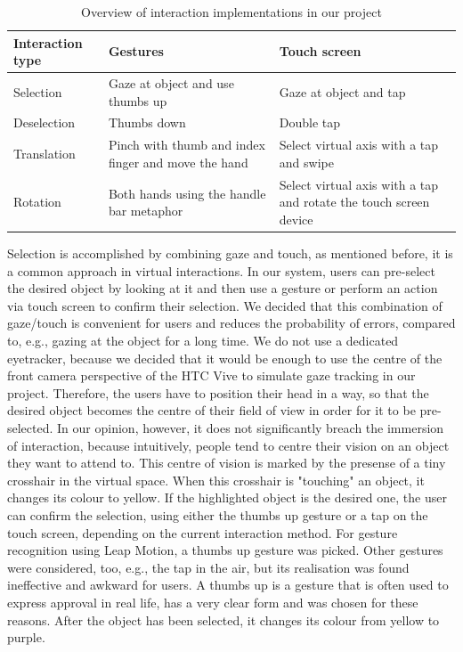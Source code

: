 \begin{table}
\centering
\begin{tabular}{|l|p{5cm}|p{5cm}|}
\hline
\textbf{Interaction type} & \textbf{Gestures} & \textbf{Touch screen} \\
\hline
Selection & Gaze at object and use thumbs up & Gaze at object and tap \\
\hline
Deselection & Thumbs down & Double tap \\
\hline
Translation & Pinch with thumb and index finger and move the hand & Select virtual axis with a tap and swipe \\
\hline
Rotation & Both hands using the handle bar metaphor & Select virtual axis with a tap and rotate the touch screen device \\
\hline
\end{tabular}
\caption{Overview of interaction implementations in our project}
\label{interactions}
\end{table}

Selection is accomplished by combining gaze and touch, as mentioned before, it is a common approach in virtual interactions. In our system, users can pre-select the desired object by looking at it and then use a gesture or perform an action via touch screen to confirm their selection. We decided that this combination of gaze/touch is convenient for users and reduces the probability of errors, compared to, e.g., gazing at the object for a long time. We do not use a dedicated eyetracker, because we decided that it would be enough to use the centre of the front camera perspective of the HTC Vive to simulate gaze tracking in our project. Therefore, the users have to position their head in a way, so that the desired object becomes the centre of their field of view in order for it to be pre-selected. In our opinion, however, it does not significantly breach the immersion of interaction, because intuitively, people tend to centre their vision on an object they want to attend to. This centre of vision is marked by the presense of a tiny crosshair in the virtual space. When this crosshair is "touching" an object, it changes its colour to yellow. If the highlighted object is the desired one, the user can confirm the selection, using either the thumbs up gesture or a tap on the touch screen, depending on the current interaction method. For gesture recognition using Leap Motion, a thumbs up gesture was picked. Other gestures were considered, too, e.g., the tap in the air, but its realisation was found ineffective and awkward for users. A thumbs up is a gesture that is often used to express approval in real life, has a very clear form and was chosen for these reasons. After the object has been selected, it changes its colour from yellow to purple.

